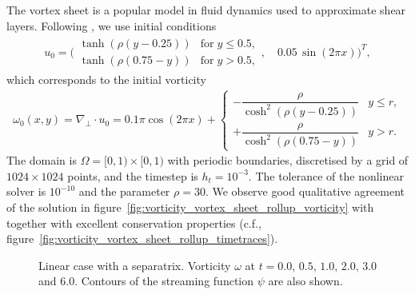 \documentclass[12pt,a4paper,reqno]{article}
\begin{document}
The vortex sheet is a popular model in fluid dynamics used to approximate shear layers.
Following \cite{Deville:2002}, we use initial conditions
\begin{align}
u_{0} = \bigg( 
\begin{array}{ll}
\tanh (\rho ( y - 0.25 )) & \text{for} \; y \leq 0.5 , \\
\tanh (\rho ( 0.75 - y )) & \text{for} \; y > 0.5 ,
\end{array} , \quad
0.05 \, \sin (2 \pi x)
 \bigg)^{T} ,
\end{align}
which corresponds to the initial vorticity
\begin{align}
\omega_{0} (x,y) = \nabla_{\perp} \cdot u_{0} =
0.1 \pi \cos(2 \pi x) + 
\begin{cases}
- \dfrac{\rho}{\cosh^2 (\rho (y - 0.25))} & y \leq r , \\
+ \dfrac{\rho}{\cosh^2 (\rho (0.75 - y))} & y >    r .
\end{cases}
\end{align}
The domain is $\Omega = [0, 1) \times [0,1)$ with periodic boundaries, discretised by a grid of $1024 \times 1024$ points, and the timestep is $h_t = 10^{-3}$. The tolerance of the nonlinear solver is $10^{-10}$ and the parameter $\rho = 30$.
We observe good qualitative agreement of the solution in figure~\ref{fig:vorticity_vortex_sheet_rollup_vorticity} with \cite[p. 328]{Deville:2002} together with excellent conservation properties (c.f., figure~\ref{fig:vorticity_vortex_sheet_rollup_timetraces}).

\begin{figure}[p]
	\centering
	
	
	
	\caption{Linear case with a separatrix. Vorticity $\omega$ at $t=0.0$, $0.5$, $1.0$, $2.0$, $3.0$ and $6.0$. Contours of the streaming function $\psi$ are also shown.}
	\label{fig:vorticity_linear_separatrix_vorticity}
\end{figure}
\end{document}
